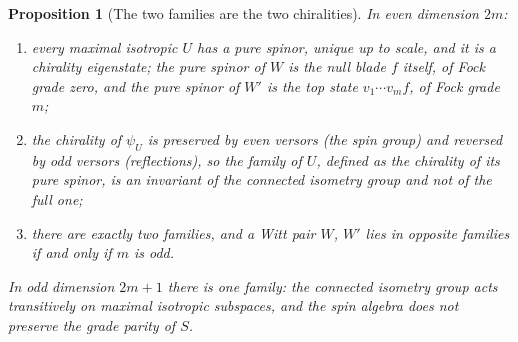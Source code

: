 \documentclass[11pt]{article}
\newtheorem{proposition}[theorem]{Proposition}
\theoremstyle{definition}
\begin{document}
\begin{proposition}[The two families are the two chiralities]\label{prop:families}
In even dimension $2m$:
\begin{enumerate}
\item[(i)] every maximal isotropic $U$ has a pure spinor, unique up to scale, and it is a chirality eigenstate; the pure spinor of $W$ is the null blade $f$ itself, of Fock grade zero, and the pure spinor of $W'$ is the top state $v_{1}\cdots v_{m}f$, of Fock grade $m$;
\item[(ii)] the chirality of $\psi_{U}$ is preserved by even versors (the spin group) and reversed by odd versors (reflections), so the \emph{family} of $U$, defined as the chirality of its pure spinor, is an invariant of the connected isometry group and not of the full one;
\item[(iii)] there are exactly two families, and a Witt pair $W$, $W'$ lies in opposite families if and only if $m$ is odd.
\end{enumerate}
In odd dimension $2m + 1$ there is one family: the connected isometry group acts transitively on maximal isotropic subspaces, and the spin algebra does not preserve the grade parity of $S$.
\end{proposition}
\end{document}
